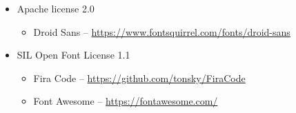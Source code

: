 \documentclass[hidelinks,titlepage,a4paper]{article}
\begin{document}
\begin{itemize}
\item Apache license 2.0
\begin{itemize}
\item Droid Sans -- \url{https://www.fontsquirrel.com/fonts/droid-sans}
\end{itemize}

\item SIL Open Font License 1.1
\begin{itemize}
\item Fira Code -- \url{https://github.com/tonsky/FiraCode}
\item Font Awesome -- \url{https://fontawesome.com/}
\end{itemize}

\end{itemize}



\end{document}
